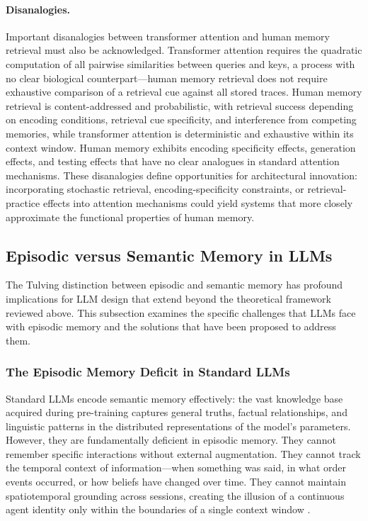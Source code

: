 \paragraph{Disanalogies.} Important disanalogies between transformer attention and human memory retrieval must also be acknowledged. Transformer attention requires the quadratic computation of all pairwise similarities between queries and keys, a process with no clear biological counterpart---human memory retrieval does not require exhaustive comparison of a retrieval cue against all stored traces. Human memory retrieval is content-addressed and probabilistic, with retrieval success depending on encoding conditions, retrieval cue specificity, and interference from competing memories, while transformer attention is deterministic and exhaustive within its context window. Human memory exhibits encoding specificity effects, generation effects, and testing effects that have no clear analogues in standard attention mechanisms. These disanalogies define opportunities for architectural innovation: incorporating stochastic retrieval, encoding-specificity constraints, or retrieval-practice effects into attention mechanisms could yield systems that more closely approximate the functional properties of human memory.

\subsection{Episodic versus Semantic Memory in LLMs}

The Tulving distinction between episodic and semantic memory \citep{tulving1972episodic, tulving1985memory} has profound implications for LLM design that extend beyond the theoretical framework reviewed above. This subsection examines the specific challenges that LLMs face with episodic memory and the solutions that have been proposed to address them.

\subsubsection{The Episodic Memory Deficit in Standard LLMs}

Standard LLMs encode semantic memory effectively: the vast knowledge base acquired during pre-training captures general truths, factual relationships, and linguistic patterns in the distributed representations of the model's parameters. However, they are fundamentally deficient in episodic memory. They cannot remember specific interactions without external augmentation. They cannot track the temporal context of information---when something was said, in what order events occurred, or how beliefs have changed over time. They cannot maintain spatiotemporal grounding across sessions, creating the illusion of a continuous agent identity only within the boundaries of a single context window \citep{ning2025episodic, sun2025episodic}.

